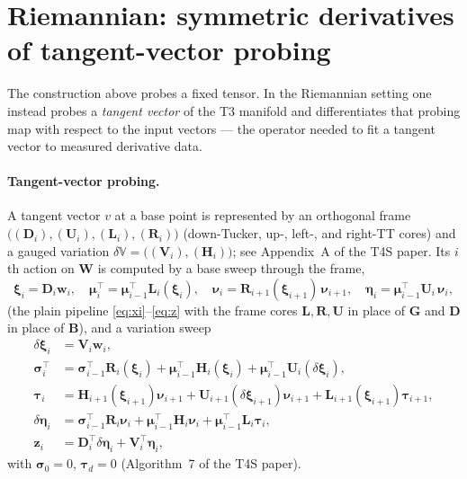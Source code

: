 \documentclass[11pt]{article}
\theoremstyle{definition}
\theoremstyle{plain}
\begin{document}
\section{Riemannian: symmetric derivatives of tangent-vector probing}
\label{sec:riem}

The construction above probes a fixed tensor. In the Riemannian setting one instead probes a
\emph{tangent vector} of the T3 manifold and differentiates that probing map with respect to the
input vectors --- the operator needed to fit a tangent vector to measured derivative data.

\paragraph{Tangent-vector probing.}
A tangent vector $v$ at a base point is represented by an orthogonal frame
$\big((\mathbf D_i),(\mathbf U_i),(\mathbf L_i),(\mathbf R_i)\big)$ (down-Tucker, up-, left-, and
right-TT cores) and a gauged variation $\delta\mathbb V = \big((\mathbf V_i),
(\mathbf H_i)\big)$; see Appendix~A of the T4S paper. Its $i$th action on $\mathbf W$ is computed
by a base sweep through the frame,
\begin{equation}
  \label{eq:rbase}
  \boldsymbol\xi_i = \mathbf D_i \mathbf w_i, \quad
  \boldsymbol\mu_i^\top = \boldsymbol\mu_{i-1}^\top \mathbf L_i(\boldsymbol\xi_i), \quad
  \boldsymbol\nu_i = \mathbf R_{i+1}(\boldsymbol\xi_{i+1})\,\boldsymbol\nu_{i+1}, \quad
  \boldsymbol\eta_i = \boldsymbol\mu_{i-1}^\top \mathbf U_i\, \boldsymbol\nu_i,
\end{equation}
(the plain pipeline \eqref{eq:xi}--\eqref{eq:z} with the frame cores $\mathbf L,\mathbf R,\mathbf U$
in place of $\mathbf G$ and $\mathbf D$ in place of $\mathbf B$), and a variation sweep
\begin{align}
  \delta\boldsymbol\xi_i &= \mathbf V_i \mathbf w_i, \label{eq:rdxi}\\
  \boldsymbol\sigma_i^\top &= \boldsymbol\sigma_{i-1}^\top \mathbf R_i(\boldsymbol\xi_i)
    + \boldsymbol\mu_{i-1}^\top \mathbf H_i(\boldsymbol\xi_i)
    + \boldsymbol\mu_{i-1}^\top \mathbf U_i(\delta\boldsymbol\xi_i), \label{eq:rsigma}\\
  \boldsymbol\tau_i &= \mathbf H_{i+1}(\boldsymbol\xi_{i+1})\boldsymbol\nu_{i+1}
    + \mathbf U_{i+1}(\delta\boldsymbol\xi_{i+1})\boldsymbol\nu_{i+1}
    + \mathbf L_{i+1}(\boldsymbol\xi_{i+1})\boldsymbol\tau_{i+1}, \label{eq:rtau}\\
  \delta\boldsymbol\eta_i &= \boldsymbol\sigma_{i-1}^\top \mathbf R_i \boldsymbol\nu_i
    + \boldsymbol\mu_{i-1}^\top \mathbf H_i \boldsymbol\nu_i
    + \boldsymbol\mu_{i-1}^\top \mathbf L_i \boldsymbol\tau_i, \label{eq:rdeta}\\
  \mathbf z_i &= \mathbf D_i^\top \delta\boldsymbol\eta_i + \mathbf V_i^\top \boldsymbol\eta_i,
    \label{eq:rz}
\end{align}
with $\boldsymbol\sigma_0 = 0$, $\boldsymbol\tau_d = 0$ (Algorithm~7 of the T4S paper).
\end{document}
